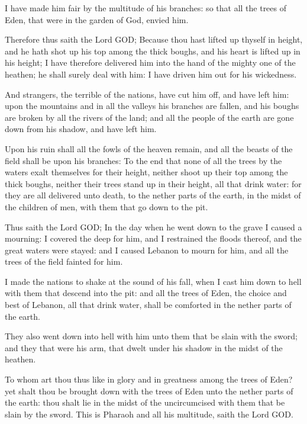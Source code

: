 \verse I have made him fair by the multitude of his branches: so that all the trees of Eden, that were in the garden of God, envied him.

\verse Therefore thus saith the Lord GOD; Because thou hast lifted up thyself in height, and he hath shot up his top among the thick boughs, and his heart is lifted up in his height; \verse I have therefore delivered him into the hand of the mighty one of the heathen; he shall surely deal with him: I have driven him out for his wickedness.

\verse And strangers, the terrible of the nations, have cut him off, and have left him: upon the mountains and in all the valleys his branches are fallen, and his boughs are broken by all the rivers of the land; and all the people of the earth are gone down from his shadow, and have left him.

\verse Upon his ruin shall all the fowls of the heaven remain, and all the beasts of the field shall be upon his branches: \verse To the end that none of all the trees by the waters exalt themselves for their height, neither shoot up their top among the thick boughs, neither their trees stand up in their height, all that drink water: for they are all delivered unto death, to the nether parts of the earth, in the midst of the children of men, with them that go down to the pit.

\verse Thus saith the Lord GOD; In the day when he went down to the grave I caused a mourning: I covered the deep for him, and I restrained the floods thereof, and the great waters were stayed: and I caused Lebanon to mourn for him, and all the trees of the field fainted for him.

\verse I made the nations to shake at the sound of his fall, when I cast him down to hell with them that descend into the pit: and all the trees of Eden, the choice and best of Lebanon, all that drink water, shall be comforted in the nether parts of the earth.

\verse They also went down into hell with him unto them that be slain with the sword; and they that were his arm, that dwelt under his shadow in the midst of the heathen.

\verse To whom art thou thus like in glory and in greatness among the trees of Eden? yet shalt thou be brought down with the trees of Eden unto the nether parts of the earth: thou shalt lie in the midst of the uncircumcised with them that be slain by the sword. This is Pharaoh and all his multitude, saith the Lord GOD.


